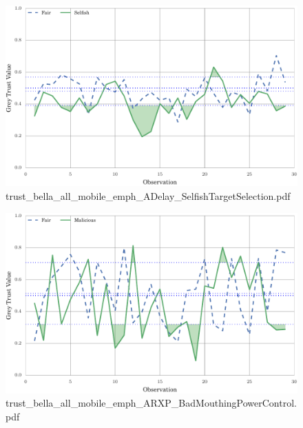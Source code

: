 \documentclass{article}
\begin{document}
\begin{figure}[h!]
\centering
\includegraphics[width=\linewidth]{trust_bella_all_mobile_emph_ADelay_SelfishTargetSelection.pdf}
\caption{trust\_bella\_all\_mobile\_emph\_ADelay\_SelfishTargetSelection.pdf}
\end{figure}




\begin{figure}[h!]
\centering
\includegraphics[width=\linewidth]{trust_bella_all_mobile_emph_ARXP_BadMouthingPowerControl.pdf}
\caption{trust\_bella\_all\_mobile\_emph\_ARXP\_BadMouthingPowerControl.pdf}
\end{figure}
\end{document}
